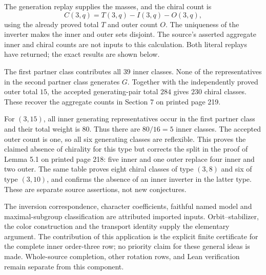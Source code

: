 \documentclass[11pt,a4paper]{article}
\begin{document}
The generation replay supplies the masses, and the chiral count is
\[
 C(3,q)=T(3,q)-I(3,q)-O(3,q),
\]
using the already proved total $T$ and outer count $O$. The uniqueness
of the inverter makes the inner and outer sets disjoint. The source's
asserted aggregate inner and chiral counts are not inputs to this
calculation. Both literal replays have returned; the exact results are
shown below.



The first partner class contributes all $39$ inner classes. None of the
representatives in the second partner class generates $G$. Together with the independently proved outer total $15$, the
accepted generating-pair total $284$ gives $230$ chiral classes. These
recover the aggregate counts in Section 7 on printed page 219.

For $(3,15)$, all inner generating representatives occur in the first
partner class and their total weight is $80$. Thus there are $80/16=5$
inner classes. The accepted outer count is one, so all six generating
classes are reflexible. This proves the claimed absence of chirality
for this type but corrects the split in the proof of Lemma 5.1 on printed
page 218: five inner and one outer replace four inner and two outer.
The same table proves eight chiral classes of type $(3,8)$ and six of
type $(3,10)$, and confirms the absence of an inner inverter in the
latter type. These are separate source assertions, not new conjectures.

The inversion correspondence, character coefficients, faithful named
model and maximal-subgroup classification are attributed imported
inputs. Orbit--stabilizer, the color construction and the transport
identity supply the elementary argument. The contribution of this
application is the explicit finite certificate for the complete inner
order-three row; no priority claim for these general ideas is made.
Whole-source completion, other rotation rows, and Lean verification
remain separate from this component.
\end{document}
